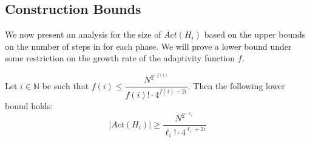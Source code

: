 \subsection{Construction Bounds}
We now present an analysis for the size of $Act(H_i)$ based on the upper bounds on the number of steps in for each phase. We will prove a lower bound under some restriction on the growth rate of the adaptivity function $f$.

\begin{theorem} \label{theorem: Act-lower-bound}
	Let $i \in \mathbb{N}$ be such that $f(i) \leq \dfrac{N^{2^{-f(i)}}} {f(i)! \cdot 4^{f(i)+2i}}$. Then the following lower bound holds:
	$$|Act(H_i)| \geq \frac{N^{2^{-\ell_i}}}{\ell_i! \cdot 4^{\ell_i+2i}}$$
\end{theorem}



